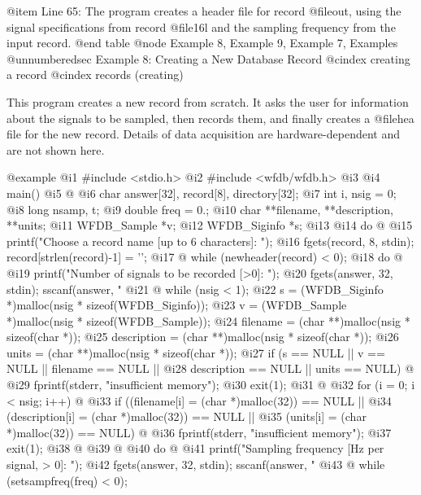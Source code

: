{{{{{{{{{@item Line 65:
The program creates a header file for record @file{out}, using
the signal specifications from record @file{16l} and the sampling
frequency from the input record.
@end table
@node     Example 8, Example 9, Example 7, Examples
@unnumberedsec Example 8: Creating a New Database Record
@cindex creating a record
@cindex records (creating)

This program creates a new record from scratch.  It asks the user for
information about the signals to be sampled, then records them, and
finally creates a @file{hea} file for the new record.  Details of
data acquisition are hardware-dependent and are not shown here. 

@example
  @i{1}  #include <stdio.h>
  @i{2}  #include <wfdb/wfdb.h>
  @i{3}  
  @i{4}  main()
  @i{5}  @{
  @i{6}      char answer[32], record[8], directory[32];
  @i{7}      int i, nsig = 0;
  @i{8}      long nsamp, t;
  @i{9}      double freq = 0.;
 @i{10}      char **filename, **description, **units;
 @i{11}      WFDB_Sample *v;
 @i{12}      WFDB_Siginfo *s;
 @i{13}  
 @i{14}      do @{
 @i{15}          printf("Choose a record name [up to 6 characters]: ");
 @i{16}          fgets(record, 8, stdin); record[strlen(record)-1] = '\0';
 @i{17}      @} while (newheader(record) < 0);
 @i{18}      do @{
 @i{19}          printf("Number of signals to be recorded [>0]: ");
 @i{20}          fgets(answer, 32, stdin); sscanf(answer, "%
 @i{21}      @} while (nsig < 1);
 @i{22}      s = (WFDB_Siginfo *)malloc(nsig * sizeof(WFDB_Siginfo));
 @i{23}      v = (WFDB_Sample *)malloc(nsig * sizeof(WFDB_Sample));
 @i{24}      filename = (char **)malloc(nsig * sizeof(char *));
 @i{25}      description = (char **)malloc(nsig * sizeof(char *));
 @i{26}      units = (char **)malloc(nsig * sizeof(char *));
 @i{27}      if (s == NULL || v == NULL || filename == NULL ||
 @i{28}          description == NULL || units == NULL) @{
 @i{29}          fprintf(stderr, "insufficient memory\n");
 @i{30}          exit(1);
 @i{31}      @}
 @i{32}      for (i = 0; i < nsig; i++) @{
 @i{33}          if ((filename[i] = (char *)malloc(32)) == NULL ||
 @i{34}              (description[i] = (char *)malloc(32)) == NULL ||
 @i{35}              (units[i] = (char *)malloc(32)) == NULL) @{
 @i{36}              fprintf(stderr, "insufficient memory\n");
 @i{37}              exit(1);
 @i{38}          @}
 @i{39}      @}
 @i{40}      do @{
 @i{41}          printf("Sampling frequency [Hz per signal, > 0]: ");
 @i{42}          fgets(answer, 32, stdin); sscanf(answer, "%
 @i{43}      @} while (setsampfreq(freq) < 0);
}}}}}}}}}}
